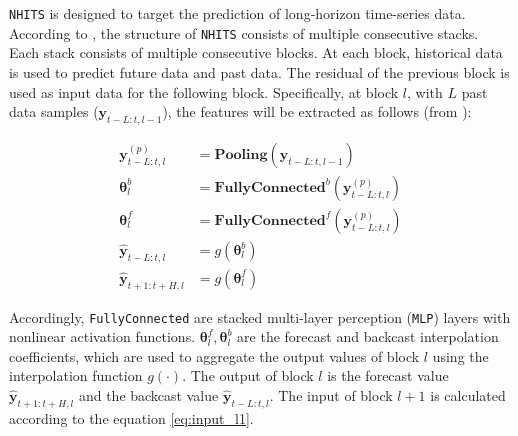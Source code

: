 \documentclass[aps,prb,groupedaddress,twocolumn,showpacs,dvipdfmx,superscriptaddress,pdftex]{revtex4-2}
\begin{document}

\verb|NHITS| is designed to target the prediction of long-horizon time-series data. According to \cite{challu2023nhits}, the structure of \verb|NHITS| consists of multiple consecutive stacks. Each stack consists of multiple consecutive blocks. At each block, historical data is used to predict future data and past data. The residual of the previous block is used as input data for the following block. Specifically, at block $l$, with $L$ past data samples ($\mathbf{y}_{t-L:t, l-1}$), the features will be extracted as follows (from \cite{challu2023nhits}):

\begin{align}
    \mathbf{y}_{t-L:t, l}^{(p)} &= \mathbf{Pooling}\left( \mathbf{y}_{t-L:t, l-1} \right)\\
    \mathbf{\theta}_l^b &= \mathbf{FullyConnected}^b \left( \mathbf{y}_{t-L:t, l}^{(p)} \right)\\
    \mathbf{\theta}_l^f &= \mathbf{FullyConnected}^f \left( \mathbf{y}_{t-L:t, l}^{(p)} \right)\\
    \mathbf{\hat{y}}_{t-L:t, l} &= g\left(\mathbf{\theta}_l^b\right)\\
    \mathbf{\hat{y}}_{t+1:t+H, l} &= g\left(\mathbf{\theta}_l^f\right)
\end{align}


Accordingly, \verb|FullyConnected| are stacked multi-layer perception (\verb|MLP|) layers with nonlinear activation functions. $\mathbf{\theta}_l^f, \mathbf{\theta}_l^b$ are the forecast and backcast interpolation coefficients, which are used to aggregate the output values of block $l$ using the interpolation function $g(\cdot)$. The output of block $l$ is the forecast value $\mathbf{\hat{y}}_{t+1:t+H, l}$ and the backcast value $\mathbf{\hat{y}}_{t-L:t, l}$. The input of block $l+1$ is calculated according to the equation \ref{eq:input_l1}.
\end{document}
